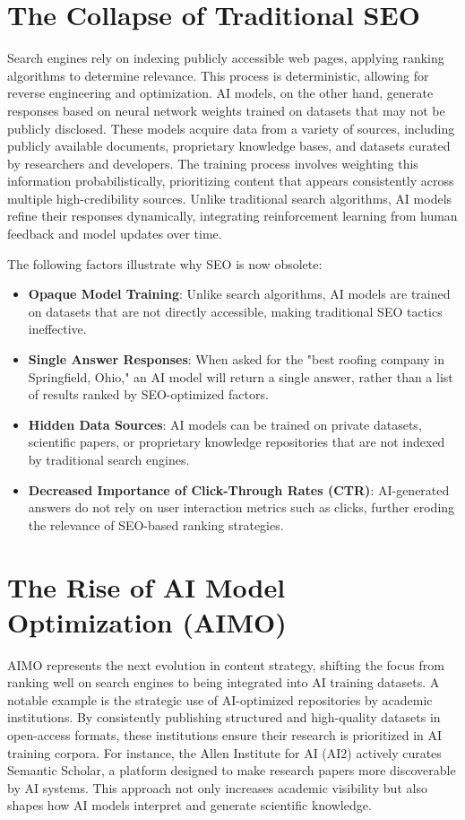 \documentclass{article}
\begin{document}
\section{The Collapse of Traditional SEO}
Search engines rely on indexing publicly accessible web pages, applying ranking algorithms to determine relevance. This process is deterministic, allowing for reverse engineering and optimization. AI models, on the other hand, generate responses based on neural network weights trained on datasets that may not be publicly disclosed. These models acquire data from a variety of sources, including publicly available documents, proprietary knowledge bases, and datasets curated by researchers and developers. The training process involves weighting this information probabilistically, prioritizing content that appears consistently across multiple high-credibility sources. Unlike traditional search algorithms, AI models refine their responses dynamically, integrating reinforcement learning from human feedback and model updates over time.

The following factors illustrate why SEO is now obsolete:
\begin{itemize}
    \item \textbf{Opaque Model Training}: Unlike search algorithms, AI models are trained on datasets that are not directly accessible, making traditional SEO tactics ineffective.
    \item \textbf{Single Answer Responses}: When asked for the "best roofing company in Springfield, Ohio," an AI model will return a single answer, rather than a list of results ranked by SEO-optimized factors.
    \item \textbf{Hidden Data Sources}: AI models can be trained on private datasets, scientific papers, or proprietary knowledge repositories that are not indexed by traditional search engines.
    \item \textbf{Decreased Importance of Click-Through Rates (CTR)}: AI-generated answers do not rely on user interaction metrics such as clicks, further eroding the relevance of SEO-based ranking strategies.
\end{itemize}

\section{The Rise of AI Model Optimization (AIMO)}
AIMO represents the next evolution in content strategy, shifting the focus from ranking well on search engines to being integrated into AI training datasets. A notable example is the strategic use of AI-optimized repositories by academic institutions\cite{semantic2024}. By consistently publishing structured and high-quality datasets in open-access formats, these institutions ensure their research is prioritized in AI training corpora. For instance, the Allen Institute for AI (AI2) actively curates Semantic Scholar, a platform designed to make research papers more discoverable by AI systems\cite{semantic2024}. This approach not only increases academic visibility but also shapes how AI models interpret and generate scientific knowledge.
\end{document}
